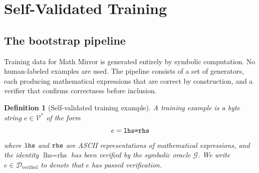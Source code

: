 \documentclass[11pt,a4paper]{article}
\newtheorem{definition}[theorem]{Definition}
\newcommand{\cV}{\mathcal{V}}
\newcommand{\cD}{\mathcal{D}}
\newcommand{\cG}{\mathcal{G}}
\begin{document}
\section{Self-Validated Training}\label{sec:training}

\subsection{The bootstrap pipeline}

Training data for Math Mirror is generated entirely by
symbolic computation.
No human-labeled examples are used.
The pipeline consists of a set of generators, each producing
mathematical expressions that are correct by construction,
and a verifier that confirms correctness before inclusion.

\begin{definition}[Self-validated training example]\label{def:example}
A training example is a byte string $e \in \cV^*$ of the form
\[
e = \text{\texttt{lhs=rhs}}
\]
where $\text{\texttt{lhs}}$ and $\text{\texttt{rhs}}$ are
ASCII representations of mathematical expressions,
and the identity $\text{lhs} = \text{rhs}$ has been verified
by the symbolic oracle $\cG$.
We write $e \in \cD_{\text{verified}}$ to denote that $e$
has passed verification.
\end{definition}
\end{document}
